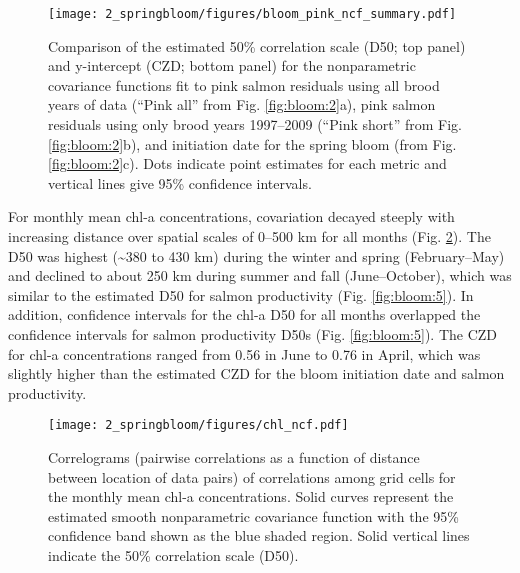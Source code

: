 \begin{figure}[htbp]
  \centering \texttt{[image: 2\_springbloom/figures/bloom\_pink\_ncf\_summary.pdf]}
  \caption[Comparison of the estimated 50\% correlation scale
           and y-intercept from the nonparametric covariance
           functions]{Comparison of the estimated 50\% correlation scale (D50;
           top panel) and y-intercept (CZD; bottom panel) for the nonparametric
           covariance functions fit to pink salmon residuals using all brood
           years of data (``Pink all'' from Fig. \ref{fig:bloom:2}a), pink
           salmon residuals using only brood years 1997--2009 (``Pink short''
           from Fig. \ref{fig:bloom:2}b), and initiation date for the spring
           bloom (from Fig. \ref{fig:bloom:2}c). Dots indicate point estimates
           for each metric and vertical lines give 95\% confidence intervals.}
  \label{fig:bloom:3}
\end{figure}

For monthly mean chl-a concentrations, covariation decayed steeply with
increasing distance over spatial scales of 0--500 km for all months (Fig.
\ref{fig:bloom:4}).  The D50 was highest (\textasciitilde{}380 to 430 km) during
the winter and spring (February--May) and declined to about 250 km during summer
and fall (June--October), which was similar to the estimated D50 for salmon
productivity (Fig. \ref{fig:bloom:5}). In addition, confidence intervals for the
chl-a D50 for all months overlapped the confidence intervals for salmon
productivity D50s (Fig.  \ref{fig:bloom:5}). The CZD for chl-a concentrations
ranged from 0.56 in June to 0.76 in April, which was slightly higher than the
estimated CZD for the bloom initiation date and salmon productivity.

\begin{figure}[htbp]
  \centering \texttt{[image: 2\_springbloom/figures/chl\_ncf.pdf]}
  \caption[Correlograms of correlations among grid cells for the monthly
           mean chl-a concentrations]{Correlograms (pairwise correlations as a
           function of distance between location of data pairs) of correlations
           among grid cells for the monthly mean chl-a concentrations. Solid
           curves represent the estimated smooth nonparametric covariance
           function with the 95\% confidence band shown as the blue shaded
           region. Solid vertical lines indicate the 50\% correlation scale
           (D50).}
  \label{fig:bloom:4}
\end{figure}

